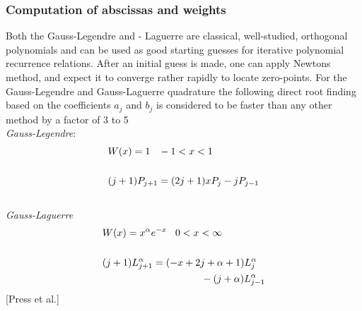 \documentclass[%
reprint,nofootinbib,
amsmath,amssymb,
aps,
]{revtex4-1}
\begin{document}
\subsubsection{Computation of abscissas and weights} \noindent
Both the Gauss-Legendre and - Laguerre are classical, well-studied, orthogonal polynomials and can be used as good starting guesses for iterative polynomial recurrence relations. After an initial guess is made, one can apply Newtons method, and expect  it to converge rather rapidly to locate zero-points. For the Gauss-Legendre and Gauss-Laguerre quadrature the following direct root finding based on the coefficients $a_j$ and $b_j$ is considered to be faster than any other method by a factor of 3 to 5\vspace{5mm}\\
\vspace{2mm} \noindent 
\textit{Gauss-Legendre}: 
\begin{align}\label{glegfunc} 
	&W(x) = 1 \hspace{3mm} -1 < x < 1 \nonumber \\ & \nonumber \\ 
	&(j+1)P_{j+1} = (2j +1)xP_j - jP_{j-1}
\end{align} 
\vspace{2mm} \\ \noindent 
\textit{Gauss-Laguerre} \vspace{2mm}
\begin{align}\label{glagfunc}
&W(x) = x^\alpha e^{-x} \hspace{3mm} 0 < x < \infty \nonumber  \\ & \nonumber \\ 
&(j+1)L_{j+1}^\alpha = (-x+2j+\alpha+1)L_j^\alpha \nonumber \\ & \hspace{35mm}-(j+\alpha)L_{j-1}^\alpha
\end{align} 
\hspace{6.8cm}[Press et al.] 
\end{document}
